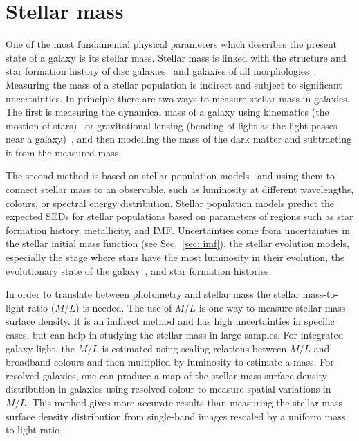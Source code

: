 
\section{Stellar mass}
\label{sec: starmass_intro}
One of the most fundamental physical parameters which describes the present state of a galaxy is its stellar mass. 
Stellar mass is linked with the structure and star formation history of disc galaxies~\citep{Gavvazi96} and galaxies of all morphologies~\citep{Scodeggio02}. 
Measuring the mass of a stellar population is indirect and subject to significant uncertainties. 
In principle there are two ways to measure stellar mass in galaxies. 
The first is measuring the dynamical mass of a galaxy using kinematics (the mostion of stars)~\citep{Cappellari06} or gravitational lensing (bending of light as the light passes near a galaxy)~\citep{Auger09}, and then modelling the mass of the dark matter and subtracting it from the measured mass. 

The second method is based on stellar population models~\citep[e.g.][]{ Bruzual93, Kotulla09} and using them to connect stellar mass to an observable, such as luminosity at different wavelengths, colours, or spectral energy distribution. 
Stellar population models predict the expected SEDs for stellar populations based on parameters of regions such as star formation history, metallicity, and IMF.
Uncertainties come from uncertainties in the stellar initial mass function (see Sec.~\ref{sec: imf}), the stellar evolution models, especially the stage where stars have the most luminosity in their evolution, the evolutionary state of the galaxy~\citep[see,][and references therein]{Dalcanton12}, and star formation histories. 


In order to translate between photometry and stellar mass the stellar mass-to-light ratio ($M/L$) is needed.
The use of $M/L$ is one way to measure stellar mass surface density. It is an indirect method and has high uncertainties in specific cases, but can help in studying the stellar mass in large samples. 
For integrated galaxy light, the $M/L$ is estimated using scaling relations between $M/L$ and broadband colours \citep[e.g.]{Bell03} and then multiplied by luminosity to estimate a mass.
For resolved galaxies, one can produce a map of the stellar mass surface density distribution in galaxies using resolved colour to measure spatial variations in $M/L$.
This method gives more accurate results than measuring the stellar mass surface density distribution from single-band images rescaled by a uniform mass to light ratio~\citep{Zibetti09}.
 


